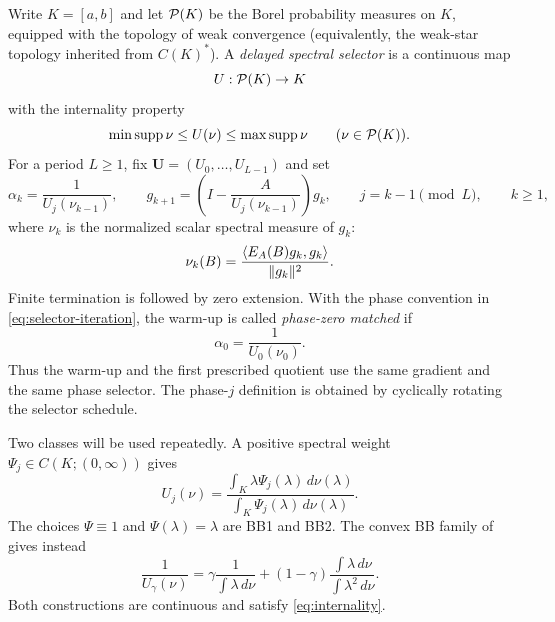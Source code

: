 \documentclass[letterpaper,twoside]{article}
\begin{document}
Write $K=[a,b]$ and let $\mathcal P(K)$ be the Borel probability measures on $K$,
equipped with the topology of weak convergence (equivalently, the weak-star
topology inherited from $C(K)^*$).
A \emph{delayed spectral selector} is a continuous map
\[
 U:\mathcal P(K)\to K
\]
with the internality property
\begin{equation}\label{eq:internality}
 \min\operatorname{supp}\nu\le U(\nu)\le\max\operatorname{supp}\nu
 \qquad(\nu\in\mathcal P(K)).
\end{equation}
For a period $L\ge1$, fix
$\bm U=(U_0,\ldots,U_{L-1})$ and set
\begin{equation}\label{eq:selector-iteration}
 \alpha_k=\frac1{U_j(\nu_{k-1})},
 \qquad g_{k+1}=\left(I-\frac{A}{U_j(\nu_{k-1})}\right)g_k,
  \qquad j=k-1\pmod L,\qquad k\ge1,
\end{equation}
where $\nu_k$ is the normalized scalar spectral measure of $g_k$:
\begin{equation}\label{eq:scalar-measure}
 \nu_k(B)=\frac{\langle E_A(B)g_k,g_k\rangle}{\lVert g_k\rVert^2}.
\end{equation}
Finite termination is followed by zero extension.
With the phase convention in \eqref{eq:selector-iteration}, the warm-up is
called \emph{phase-zero matched} if
\begin{equation}\label{eq:general-matched-warmup}
 \alpha_0=\frac1{U_0(\nu_0)}.
\end{equation}
Thus the warm-up and the first prescribed quotient use the same gradient and
the same phase selector.  The phase-$j$ definition is obtained by cyclically
rotating the selector schedule.

Two classes will be used repeatedly.  A positive spectral weight
$\Psi_j\in C(K;(0,\infty))$ gives
\begin{equation}\label{eq:weighted-selector}
 U_j(\nu)=
 \frac{\int_K\lambda\Psi_j(\lambda)\,d\nu(\lambda)}
      {\int_K\Psi_j(\lambda)\,d\nu(\lambda)}.
\end{equation}
The choices $\Psi\equiv1$ and $\Psi(\lambda)=\lambda$ are BB1 and BB2.
The convex BB family of \cite{DaiHuangLiu2019} gives instead
\begin{equation}\label{eq:convex-selector}
 \frac1{U_\gamma(\nu)}
 =\gamma\frac1{\int\lambda\,d\nu}
 +(1-\gamma)\frac{\int\lambda\,d\nu}{\int\lambda^2\,d\nu}.
\end{equation}
Both constructions are continuous and satisfy \eqref{eq:internality}.
\end{document}
